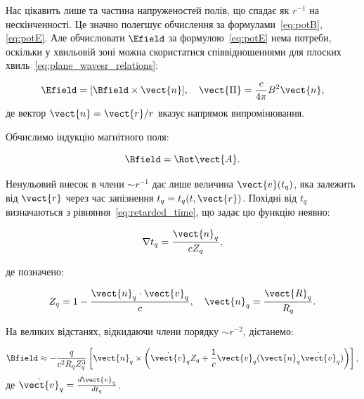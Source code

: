 Нас цікавить лише та частина напруженостей полів, що спадає як \( r^{-1} \) на нескінченності. Це значно полегшує
обчислення за формулами~\eqref{eq:potB}, \eqref{eq:potE}. Але обчислювати \( \Efield \) за формулою~\eqref{eq:potE} нема
потреби, оскільки у хвильовій зоні можна скористатися співвідношеннями для плоских хвиль~\eqref{eq:plane_wavesr_relations}:

\begin{equation*}
	\Efield = [\Bfield \times \vect{n}], \quad \vect{\Pi} = \frac{c}{4\pi} B^2 \vect{n},
\end{equation*}
де вектор \( \vect{n} = \vect{r}/{r} \) вказує напрямок випромінювання.

Обчислимо індукцію магнітного поля:

\begin{equation*}
	\Bfield = \Rot\vect{A}.
\end{equation*}

Ненульовий внесок в члени \( \sim r^{-1} \) дає лише величина \( \vect{v}(t_q) \), яка залежить від \( \vect{r} \)
через час запізнення \( t_q = t_q(t, \vect{r}) \). Похідні від \( t_q \) визначаються з
рівняння~\eqref{eq:retarded_time}, що задає цю функцію неявно:

\begin{equation}
	\nabla t_q = \frac{\vect{n}_q}{c Z_q},
	\label{eq:nabla_tq}
\end{equation}

де позначено:

\begin{equation*}
	Z_q = 1 - \frac{\vect{n}_q \cdot \vect{v}_q}{c}, \quad \vect{n}_q = \frac{\vect{R}_q}{R_q}.
\end{equation*}

На великих відстанях, відкидаючи члени порядку \( \sim r^{-2} \), дістанемо:

\begin{equation}
	\Bfield \approx -\frac{q}{c^2R_qZ^3_q} \left[ \vect{n}_q \times \left( \dot{\vect{v}}_q Z_q + \frac1c\vect{v}_q(\vect{n}_q \dot{\vect{v}}_q)\right) \right],
	\label{eq:magnetic_field}
\end{equation}
де \( \dot{\vect{v}}_q = \frac{d\vect{v}_q}{dt_q} \).

